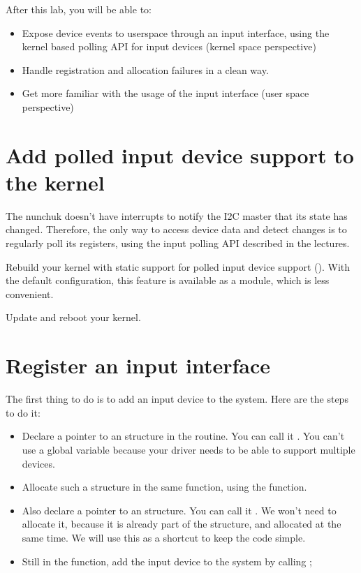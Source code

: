 
After this lab, you will be able to:

\begin{itemize}
\item Expose device events to userspace through an input interface,
      using the kernel based polling API for input devices
      (kernel space perspective)
\item Handle registration and allocation failures in a clean
      way.
\item Get more familiar with the usage of the input interface
      (user space perspective)
\end{itemize}

\section{Add polled input device support to the kernel}

The nunchuk doesn't have interrupts to notify the I2C master that 
its state has changed. Therefore, the only way to access device data
and detect changes is to regularly poll its registers, using the input
polling API described in the lectures.

Rebuild your kernel with static support for polled input device support
(). With the default configuration, this
feature is available as a module, which is less convenient.

Update and reboot your kernel.

\section{Register an input interface}

The first thing to do is to add an input device to the system. Here are
the steps to do it:

\begin{itemize}
\item Declare a pointer to an  structure in the
       routine. You can call it .
      You can't use a global variable because your driver needs to be
      able to support multiple devices.
\item Allocate such a structure in the same function, using the
       function. 
\item Also declare a pointer to an  structure. You can 
      call it . We won't need to allocate it, because it
      is already part of the  structure,
      and allocated at the same time.
      We will use this as a shortcut to keep the code simple.
\item Still in the  function, add the input device to
      the system by calling ;
\end{itemize}

